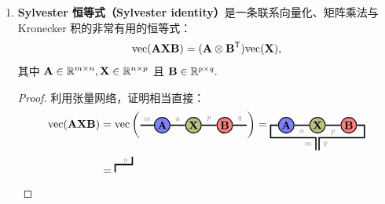 \begin{remark}
\begin{enumerate}
\item \textbf{Sylvester 恒等式（Sylvester identity）}是一条联系向量化、矩阵乘法与 Kronecker 积的非常有用的恒等式：$$\mathrm{vec}(\mathbf{A}\mathbf{X}\mathbf{B}) = (\mathbf{A}\otimes \mathbf{B}^{\mathsf{T}})\mathrm{vec}(\mathbf{X}),$$
其中 $\mathbf{A}\in\mathbb{R}^{m\times n},\mathbf{X}\in\mathbb{R}^{n\times p}$ 且 $\mathbf{B}\in\mathbb{R}^{p\times q}.$
\begin{proof}
利用张量网络，证明相当直接： 
\begin{align*}
\vectorize(\Ab\Xb\Bb) &=
 \vectorize\left(\begin{tikzpicture}[baseline=-0.5ex]
    \tikzset{tensor/.style = {minimum size = 0.5cm,shape = circle,thick,draw=black,inner sep = 0pt}, edge/.style = {thick,line width=.4mm},every loop/.style={}}
    \def\x{6}
    \node[tensor,fill=blue!50!white] (A) at (\x-1,0) {$\Ab$};
    \node[tensor,fill=green!50!red!50!white] (X) at (\x,0) {$\Xb$};
    \node[tensor,fill=red!50!white] (B) at (\x+1,0) {$\Bb$};
    \draw[edge] (A) -- (X) node [midway,above] {\scalebox{0.7}{\dimcolor{$n$}}};
    \draw[edge] (X) -- (B) node [midway,above] {\scalebox{0.7}{\dimcolor{$p$}}};
    \draw[edge] (A) -- (\x-1.7,0) node [midway,above] {\scalebox{0.7}{\dimcolor{$m$}}};
    \draw[edge] (B) -- (\x+1.7,0) node [midway,above] {\scalebox{0.7}{\dimcolor{$q$}}};
    \end{tikzpicture}\right)
=
\begin{tikzpicture}[baseline=-0.5ex]
    \tikzset{tensor/.style = {minimum size = 0.5cm,shape = circle,thick,draw=black,inner sep = 0pt}, edge/.style = {thick,line width=.4mm},every loop/.style={}}
    \def\x{6}
    \node[tensor,fill=blue!50!white] (A) at (\x-1,0) {$\Ab$};
    \node[tensor,fill=green!50!red!50!white] (X) at (\x,0) {$\Xb$};
    \node[tensor,fill=red!50!white] (B) at (\x+1,0) {$\Bb$};
    \draw[edge] (A) -- (X) node [midway,below] {\scalebox{0.7}{\dimcolor{$n$}}};
    \draw[edge] (X) -- (B) node [midway,below] {\scalebox{0.7}{\dimcolor{$p$}}};
    \draw[edge] (A) -- (\x-1.5,0) -- (\x-1.5,-0.4) -- (\x-0.05,-0.4)--(\x-0.05,-0.8) node [midway,left] {\scalebox{0.7}{\dimcolor{$m$}}};
    \draw[edge] (B) -- (\x+1.5,0) -- (\x+1.5,-0.4) -- (\x+0.05,-0.4)--(\x+0.05,-0.8) node [midway,right] {\scalebox{0.7}{\dimcolor{$q$}}};
\end{tikzpicture}\\
&=
\begin{tikzpicture}[baseline=-2ex]
    \tikzset{tensor/.style = {minimum size = 0.5cm,shape = circle,thick,draw=black,inner sep = 0pt}, edge/.style = {thick,line width=.4mm},every loop/.style={}}
    \def\x{6}
    \draw[edge] (\x-0.05,0.25) -- (\x-0.05,0) node [midway, left] {\scalebox{0.7}{\dimcolor{$n$}}}   -- (\x-0.6,0) -- (\x-0.6,-0.25) ; 

\end{tikzpicture}
\end{align*}
\end{proof}
\end{enumerate}
\end{remark}
